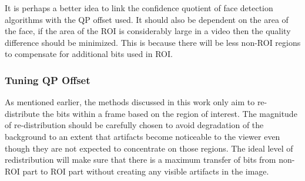 \documentclass[11pt]{article} %
\begin{document}
It is perhaps a better idea to link the confidence quotient of face detection algorithms with the QP offset used. It should also be dependent on the area of the face, if the area of the ROI is considerably large in a video then the quality difference should be minimized. This is because there will be less non-ROI regions to compensate for additional bits used in ROI.
\fi

%
\subsubsection{Tuning QP Offset} \label{sec:Tuning QP Offset}
As mentioned earlier, the methods discussed in this work only aim to re-distribute the bits within a frame based on the region of interest. The magnitude of re-distribution should be carefully chosen to avoid degradation of the background to an extent that artifacts become noticeable to the viewer even though they are not expected to concentrate on those regions. The ideal level of redistribution will make sure that there is a maximum transfer of bits from non-ROI part to ROI part without creating any visible artifacts in the image.
\iffalse
\end{document}
